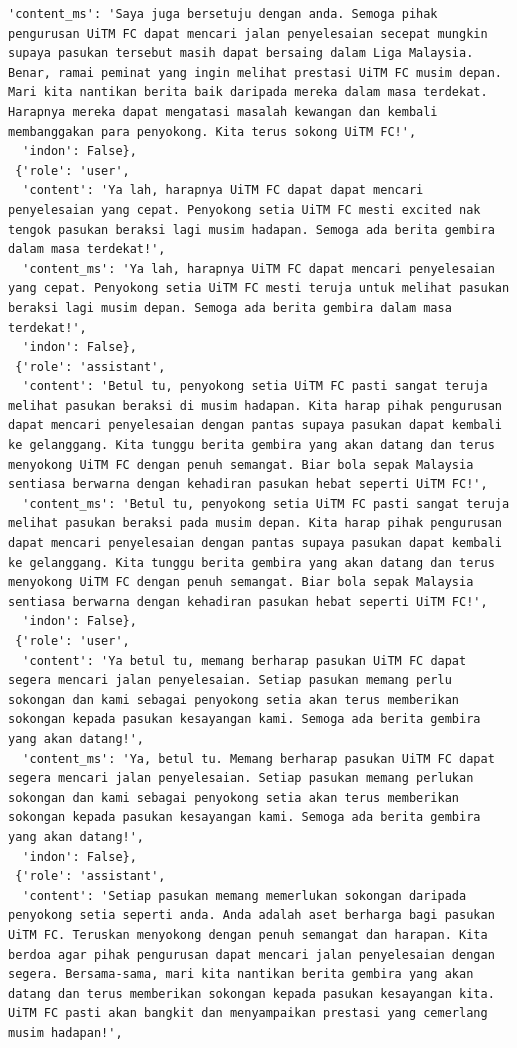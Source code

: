 \documentclass[preprint]{article}
\begin{document}
\begin{lstlisting}[breaklines=true]
  'content_ms': 'Saya juga bersetuju dengan anda. Semoga pihak pengurusan UiTM FC dapat mencari jalan penyelesaian secepat mungkin supaya pasukan tersebut masih dapat bersaing dalam Liga Malaysia. Benar, ramai peminat yang ingin melihat prestasi UiTM FC musim depan. Mari kita nantikan berita baik daripada mereka dalam masa terdekat. Harapnya mereka dapat mengatasi masalah kewangan dan kembali membanggakan para penyokong. Kita terus sokong UiTM FC!',
  'indon': False},
 {'role': 'user',
  'content': 'Ya lah, harapnya UiTM FC dapat dapat mencari penyelesaian yang cepat. Penyokong setia UiTM FC mesti excited nak tengok pasukan beraksi lagi musim hadapan. Semoga ada berita gembira dalam masa terdekat!',
  'content_ms': 'Ya lah, harapnya UiTM FC dapat mencari penyelesaian yang cepat. Penyokong setia UiTM FC mesti teruja untuk melihat pasukan beraksi lagi musim depan. Semoga ada berita gembira dalam masa terdekat!',
  'indon': False},
 {'role': 'assistant',
  'content': 'Betul tu, penyokong setia UiTM FC pasti sangat teruja melihat pasukan beraksi di musim hadapan. Kita harap pihak pengurusan dapat mencari penyelesaian dengan pantas supaya pasukan dapat kembali ke gelanggang. Kita tunggu berita gembira yang akan datang dan terus menyokong UiTM FC dengan penuh semangat. Biar bola sepak Malaysia sentiasa berwarna dengan kehadiran pasukan hebat seperti UiTM FC!',
  'content_ms': 'Betul tu, penyokong setia UiTM FC pasti sangat teruja melihat pasukan beraksi pada musim depan. Kita harap pihak pengurusan dapat mencari penyelesaian dengan pantas supaya pasukan dapat kembali ke gelanggang. Kita tunggu berita gembira yang akan datang dan terus menyokong UiTM FC dengan penuh semangat. Biar bola sepak Malaysia sentiasa berwarna dengan kehadiran pasukan hebat seperti UiTM FC!',
  'indon': False},
 {'role': 'user',
  'content': 'Ya betul tu, memang berharap pasukan UiTM FC dapat segera mencari jalan penyelesaian. Setiap pasukan memang perlu sokongan dan kami sebagai penyokong setia akan terus memberikan sokongan kepada pasukan kesayangan kami. Semoga ada berita gembira yang akan datang!',
  'content_ms': 'Ya, betul tu. Memang berharap pasukan UiTM FC dapat segera mencari jalan penyelesaian. Setiap pasukan memang perlukan sokongan dan kami sebagai penyokong setia akan terus memberikan sokongan kepada pasukan kesayangan kami. Semoga ada berita gembira yang akan datang!',
  'indon': False},
 {'role': 'assistant',
  'content': 'Setiap pasukan memang memerlukan sokongan daripada penyokong setia seperti anda. Anda adalah aset berharga bagi pasukan UiTM FC. Teruskan menyokong dengan penuh semangat dan harapan. Kita berdoa agar pihak pengurusan dapat mencari jalan penyelesaian dengan segera. Bersama-sama, mari kita nantikan berita gembira yang akan datang dan terus memberikan sokongan kepada pasukan kesayangan kita. UiTM FC pasti akan bangkit dan menyampaikan prestasi yang cemerlang musim hadapan!',

\end{lstlisting}
\end{document}
